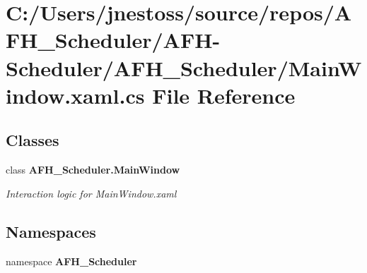 \section{C\+:/\+Users/jnestoss/source/repos/\+A\+F\+H\+\_\+\+Scheduler/\+A\+F\+H-\/\+Scheduler/\+A\+F\+H\+\_\+\+Scheduler/\+Main\+Window.xaml.\+cs File Reference}
\label{_main_window_8xaml_8cs}
\subsection*{Classes}
\begin{DoxyCompactItemize}
\item 
class \textbf{ A\+F\+H\+\_\+\+Scheduler.\+Main\+Window}
\begin{DoxyCompactList}\small\item\em Interaction logic for Main\+Window.\+xaml \end{DoxyCompactList}\end{DoxyCompactItemize}
\subsection*{Namespaces}
\begin{DoxyCompactItemize}
\item 
namespace \textbf{ A\+F\+H\+\_\+\+Scheduler}
\end{DoxyCompactItemize}
